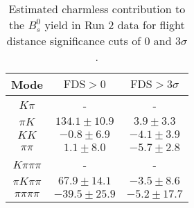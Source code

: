 \begin{table}[h]
  \centering
  \begin{tabular}{ccc}
      \toprule
      Mode & $\mathrm{FDS} > 0$ & $\mathrm{FDS} > 3\sigma$ \\
      \midrule
      $K\pi$ & \-- & \-- \\
      $\pi K$ & $134.1 \pm 10.9$ & $3.9 \pm 3.3$ \\
      $KK$ & $-0.8 \pm 6.9$ & $-4.1 \pm 3.9$ \\
      $\pi\pi$ & $1.1 \pm 8.0$ & $-5.7 \pm 2.8$ \\
      $K\pi\pi\pi$ & \-- & \-- \\
      $\pi K\pi\pi$ & $67.9 \pm 14.1$ & $-3.5 \pm 8.6$ \\
      $\pi\pi\pi\pi$ & $-39.5 \pm 25.9$ & $-5.2 \pm 17.7$ \\
      \bottomrule
  \end{tabular}
  \caption{\small Estimated charmless contribution to the $B^{0}_{s}$ yield in Run 2 data for flight distance significance cuts of 0  and $3\sigma$.}
\label{tab:charmless_yields_Bs_run_2}
\end{table}
